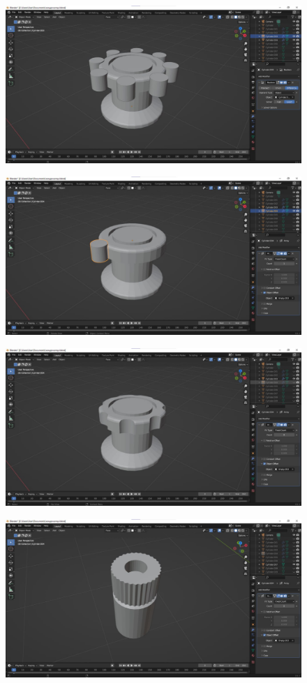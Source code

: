 \documentclass[a4paper,12pt]{article}
\begin{document}
    \begin{figure}[H]
        \centering
        \includegraphics[width=0.7\linewidth]{ph5}
    \end{figure}
    \begin{figure}[H]
        \centering
        \includegraphics[width=0.7\linewidth]{ph6}
    \end{figure}
    \begin{figure}[H]
        \centering
        \includegraphics[width=0.7\linewidth]{ph7}
    \end{figure}
    \begin{figure}[H]
        \centering
        \includegraphics[width=0.7\linewidth]{ph8}
    \end{figure}
\end{document}
